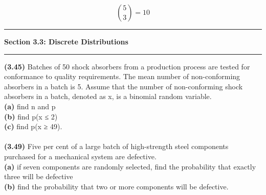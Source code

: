 \documentclass[11pt]{article}
\newcommand\question[2]{\vspace{.25in}\hrule\textbf{#1: #2}\vspace{.5em}\hrule\vspace{.10in}}
\renewcommand\part[1]{\vspace{.10in}\textbf{(#1)}}
\begin{document}
\[
{5\choose 3} = 10 
\]

\clearpage

\question{Section 3.3}{Discrete Distributions}

\part{3.45} Batches of 50 shock absorbers from a production process are tested for conformance to quality requirements. The mean number of non-conforming absorbers in a batch is 5. Assume that the number of non-conforming shock absorbers in a batch, denoted as x, is a binomial random variable. \\

\part{a} find n and p \\


\part{b} find p(x ≤ 2) \\
\part{c} find p(x ≥ 49). \\ \ \\

\part{3.49} Five per cent of a large batch of high-strength steel components purchased for a mechanical system are defective. \\

\part{a} if seven components are randomly selected, find the probability that exactly three will be defective \\

\part{b} find the probability that two or more components will be defective. \\ \ \\
\end{document}
